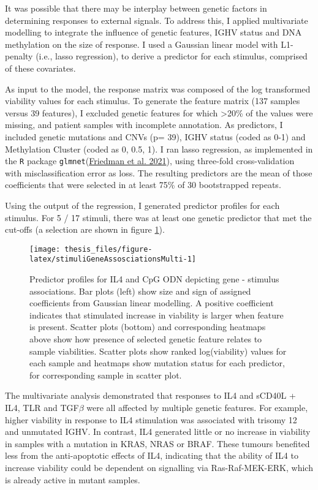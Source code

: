 \documentclass[11pt, a4paper, twosided]{book}
\begin{document}
It was possible that there may be interplay between genetic factors in determining responses to external signals. To address this, I applied multivariate modelling to integrate the influence of genetic features, IGHV status and DNA methylation on the size of response. I used a Gaussian linear model with L1-penalty (i.e., lasso regression), to derive a predictor for each stimulus, comprised of these covariates.

As input to the model, the response matrix was composed of the log transformed viability values for each stimulus. To generate the feature matrix (137 samples versus 39 features), I excluded genetic features for which \textgreater20\% of the values were missing, and patient samples with incomplete annotation. As predictors, I included genetic mutations and CNVs (p= 39), IGHV status (coded as 0-1) and Methylation Cluster (coded as 0, 0.5, 1). I ran lasso regression, as implemented in the \texttt{R} package \texttt{glmnet}(\protect\hyperlink{ref-R-glmnet}{Friedman et al. 2021}), using three-fold cross-validation with misclassification error as loss. The resulting predictors are the mean of those coefficients that were selected in at least 75\% of 30 bootstrapped repeats.

Using the output of the regression, I generated predictor profiles for each stimulus. For 5 / 17 stimuli, there was at least one genetic predictor that met the cut-offs (a selection are shown in figure \ref{fig:stimuliGeneAssosciationsMulti}).


\begin{figure}

{\centering \texttt{[image: thesis\_files/figure-latex/stimuliGeneAssosciationsMulti-1]} 

}

\caption{Predictor profiles for IL4 and CpG ODN depicting gene - stimulus associations. Bar plots (left) show size and sign of assigned coefficients from Gaussian linear modelling. A positive coefficient indicates that stimulated increase in viability is larger when feature is present. Scatter plots (bottom) and corresponding heatmaps above show how presence of selected genetic feature relates to sample viabilities. Scatter plots show ranked log(viability) values for each sample and heatmaps show mutation status for each predictor, for corresponding sample in scatter plot.}\label{fig:stimuliGeneAssosciationsMulti}
\end{figure}
The multivariate analysis demonstrated that responses to IL4 and sCD40L + IL4, TLR and TGF\(\beta\) were all affected by multiple genetic features.
For example, higher viability in response to IL4 stimulation was associated with trisomy 12 and unmutated IGHV. In contrast, IL4 generated little or no increase in viability in samples with a mutation in KRAS, NRAS or BRAF. These tumours benefited less from the anti-apoptotic effects of IL4, indicating that the ability of IL4 to increase viability could be dependent on signalling via Ras-Raf-MEK-ERK, which is already active in mutant samples.
\end{document}
